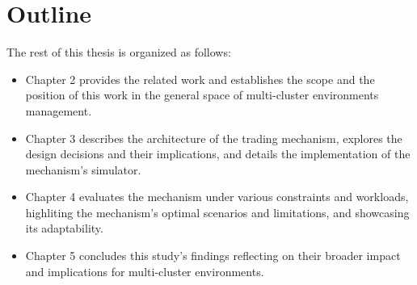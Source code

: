 \section{Outline}
The rest of this thesis is organized as follows:
\begin{itemize}
  
  \item Chapter 2 provides the related work and establishes the scope and the
    position of this work in the general space of multi-cluster environments
    management.

  \item Chapter 3 describes the architecture of the trading mechanism, explores
    the design decisions and their implications, and details the implementation
    of the mechanism's simulator.  

  \item Chapter 4 evaluates the mechanism under various constraints and
    workloads, highliting the mechanism's optimal scenarios and limitations,
    and showcasing its adaptability.

  \item Chapter 5 concludes this study's findings reflecting on their broader
    impact and implications for multi-cluster environments.  

\end{itemize}

